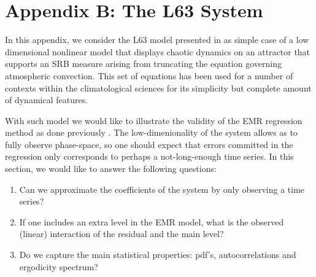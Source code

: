 \documentclass[12pt]{article}
\begin{document}
\section*{Appendix B: The L63 System}

In this appendix, we consider the L63 model presented in \cite{lorenzdeterministic1963} as simple case of a low dimensional nonlinear model that displays chaotic dynamics on an attractor that supports an SRB measure arising from truncating the equation governing atmospheric convection. This set of equations has been used for a number of contexts within the climatological sciences for its simplicity but complete amount of dynamical features. 

With such model we would like to illustrate the validity of the EMR regression method as done previously \cite{Kravtsov2005, kondrashovdata2015}. The low-dimenionality of the system allows as to fully observe phase-space, so one should expect that errors committed in the regression only corresponds to perhaps a not-long-enough time series. In this section, we would like to answer the following questions:

\begin{enumerate}
	\item Can we approximate the coefficients of the system by only observing a time series? 
	\item If one includes an extra level in the EMR model, what is the observed (linear) interaction of the residual and the main level?
	\item Do we capture the main statistical properties: pdf's, autocorrelations and ergodicity spectrum?
\end{enumerate}
\end{document}

